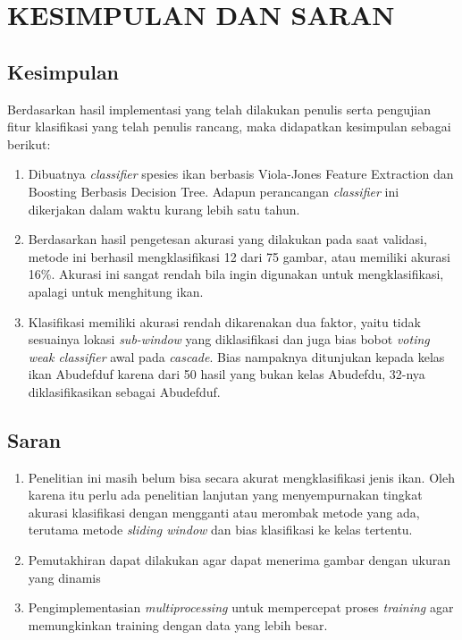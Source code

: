 
\chapter{KESIMPULAN DAN SARAN}

\section{Kesimpulan}
Berdasarkan hasil implementasi yang telah dilakukan penulis serta pengujian fitur klasifikasi yang 
telah penulis rancang, maka didapatkan kesimpulan sebagai berikut:

\begin{enumerate}
	\item Dibuatnya \textit{classifier} spesies ikan berbasis Viola-Jones Feature Extraction dan Boosting
	Berbasis Decision Tree. Adapun perancangan \textit{classifier} ini dikerjakan dalam 
	waktu kurang lebih satu tahun.

	\item Berdasarkan hasil pengetesan akurasi yang dilakukan pada saat validasi, metode ini 
	berhasil mengklasifikasi 12 dari 75 gambar, atau memiliki akurasi 16\%. Akurasi ini 
	sangat rendah bila ingin digunakan untuk mengklasifikasi, apalagi untuk menghitung ikan.

	\item Klasifikasi memiliki akurasi rendah dikarenakan dua faktor, yaitu tidak 
	sesuainya lokasi \emph{sub-window} yang diklasifikasi dan juga bias bobot \textit{voting} 
	\emph{weak classifier} awal pada \emph{cascade}. Bias nampaknya ditunjukan kepada kelas 
	ikan Abudefduf karena dari 50 hasil yang bukan kelas Abudefdu, 32-nya diklasifikasikan 
	sebagai Abudefduf.

\end{enumerate}

\section{Saran}
\begin{enumerate}
	\item Penelitian ini masih belum bisa secara akurat mengklasifikasi jenis ikan. Oleh 
	karena itu perlu ada penelitian lanjutan yang menyempurnakan tingkat akurasi klasifikasi 
	dengan mengganti atau merombak metode yang ada, terutama metode \emph{sliding window} 
	dan bias klasifikasi ke kelas tertentu.
	\item Pemutakhiran dapat dilakukan agar dapat menerima gambar dengan ukuran yang 
	dinamis 
	\item Pengimplementasian \textit{multiprocessing} untuk mempercepat proses 
	\textit{training} agar memungkinkan training dengan data yang lebih besar.
\end{enumerate}

\begin{comment}

\end{comment}
